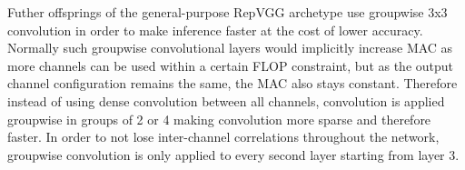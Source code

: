 Futher offsprings of the general-purpose RepVGG archetype use groupwise 3x3 convolution in order to make inference faster at the cost of lower accuracy. Normally such groupwise convolutional layers would implicitly increase MAC as more channels can be used within a certain FLOP constraint, but as the output channel configuration remains the same, the MAC also stays constant. Therefore instead of using dense convolution between all channels, convolution is applied groupwise in groups of 2 or 4 making convolution more sparse and therefore faster. In order to not lose inter-channel correlations throughout the network, groupwise convolution is only applied to every second layer starting from layer 3.  
